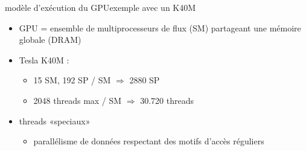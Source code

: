 \documentclass[11pt,mathserif]{beamer}
\begin{document}
\begin{frame}{modèle d'exécution du GPU}{exemple avec un K40M}
\begin{minipage}[c]{0.59\linewidth}
  \begin{itemize}[<+->]
    \item GPU = ensemble de multiprocesseurs de flux (SM) partageant une mémoire globale (DRAM)
    \item Tesla K40M : 
      \begin{itemize}
        \item 15 SM, 192 SP / SM $\Rightarrow$ 2880 SP
        \item 2048 threads max / SM $\Rightarrow$ 30.720 threads
      \end{itemize}
    \item threads «speciaux»
      \begin{itemize}
        \item parallélisme de données respectant des motifs d'accès réguliers
      \end{itemize}
  \end{itemize}
\end{minipage}
\begin{minipage}[c]{0.39\linewidth}
\begin{center}
\end{center}
\end{minipage}
\end{frame}
\end{document}
